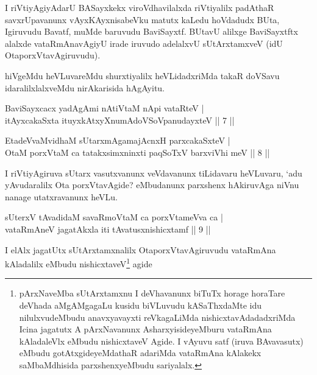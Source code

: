 \begin{artha}
I riVtiyAgiyAdarU BASayxkekx viroVdhavilalxda riVtiyalilx padAthaR savxrUpavanunx vAyxKAyxnisabeVku matutx kaLedu hoVdadudx BUta, Igiruvudu Bavatf, muMde baruvudu BaviSayxtf. BUtavU alilxge BaviSayxtftx alalxde vataRmAnavAgiyU irade iruvudo adelalxvU sUtArxtamxveV (idU OtaporxVtavAgiruvudu).

hiVgeMdu heVLuvareMdu shurxtiyalilx heVLidadxriMda takaR doVSavu idaralilxlalxveMdu nirAkarisida hAgAyitu.
\end{artha}%

\begin{shl}
BaviSayxcacx yadAgAmi nAtiVtaM nApi vataRteV |\\
itAyxcakaSxta ituyxkAtxyX\s numAdoVSoV\s panudayxteV \hfill || 7 ||
\end{shl}

\begin{shl}
EtadeVvaMvidhaM sUtarxmAgamajAcnxH parxcakaSxteV |\\
OtaM porxVtaM ca tatakxsimxninxti paqSoTxV barxviVhi meV \hfill || 8 ||
\end{shl}

\begin{artha}
I riVtiyAgiruva sUtarx vasutxvanunx veVdavanunx tiLidavaru heVLuvaru, `adu yAvudaralilx Ota porxVtavAgide? eMbudanunx parxshenx hAkiruvAga niVnu nanage utatxravanunx heVLu.
\end{artha}


\begin{shl}
sUterxV tAvadidaM savaRmoVtaM ca porxVtameVva ca |\\
vataRmAneV jagatAkxla iti tAvatusxnishicxtamf \hfill || 9 ||
\end{shl}

\begin{artha}
I elAlx jagatUtx sUtArxtamxnalilx OtaporxVtavAgiruvudu vataRmAna kAladalilx eMbudu nishicxtaveV\footnote[1]{pArxNaveMba sUtArxtamxnu I deVhavanunx biTuTx horage horaTare deVhada aMgAMgagaLu kusidu biVLuvudu kASaThxdaMte idu nilulxvudeMbudu anavxyavayxti reVkagaLiMda nishicxtavAdadadxriMda Icina jagatutx A pArxNavanunx AsharxyisideyeMburu vataRmAna kAladaleVlx eMbudu nishicxtaveV Agide. I vAyuvu satf (iruva BAvavasutx) eMbudu gotAtxgideyeMdathaR adariMda vataRmAna kAlakekx saMbaMdhisida parxshenxyeMbudu sariyalalx.} agide
\end{artha}

